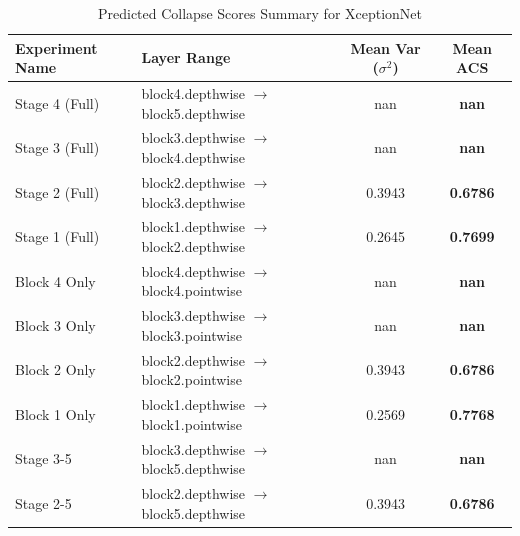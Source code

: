 \begin{table}[h]
\caption{Predicted Collapse Scores Summary for XceptionNet}
\label{tab:acs_summary_xceptionnet}
\begin{tabular}{llcc}
\toprule
Experiment Name & Layer Range & Mean Var ($\sigma^2$) & Mean ACS \\
\midrule
Stage 4 (Full) & block4.depthwise $\to$ block5.depthwise & nan & \textbf{nan} \\
Stage 3 (Full) & block3.depthwise $\to$ block4.depthwise & nan & \textbf{nan} \\
Stage 2 (Full) & block2.depthwise $\to$ block3.depthwise & 0.3943 & \textbf{0.6786} \\
Stage 1 (Full) & block1.depthwise $\to$ block2.depthwise & 0.2645 & \textbf{0.7699} \\
Block 4 Only & block4.depthwise $\to$ block4.pointwise & nan & \textbf{nan} \\
Block 3 Only & block3.depthwise $\to$ block3.pointwise & nan & \textbf{nan} \\
Block 2 Only & block2.depthwise $\to$ block2.pointwise & 0.3943 & \textbf{0.6786} \\
Block 1 Only & block1.depthwise $\to$ block1.pointwise & 0.2569 & \textbf{0.7768} \\
Stage 3-5 & block3.depthwise $\to$ block5.depthwise & nan & \textbf{nan} \\
Stage 2-5 & block2.depthwise $\to$ block5.depthwise & 0.3943 & \textbf{0.6786} \\
\bottomrule
\end{tabular}
\end{table}
